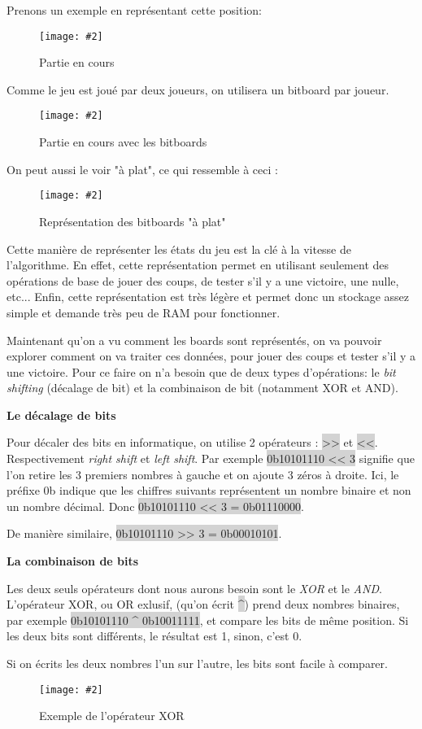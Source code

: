 \documentclass[a4paper]{article}
\newcommand{\img}[3][]{
    \begin{figure}[H]
        \centering
        \texttt{[image: \#2]}
        \caption{#1}    
    \end{figure}
}
\newcommand{\inlinecode}[1]{\colorbox{lightgray}{#1}}
\newcommand{\ptitle}[1]{\vspace{10pt}
{\large \textbf{#1}}}
\begin{document}
    Prenons un exemple en représentant cette position:
    \img[Partie en cours]{Images/ExempleBitBoardsPt1.png}{0.3}

    Comme le jeu est joué par deux joueurs, on utilisera un bitboard par joueur.
    \img[Partie en cours avec les bitboards]{Images/ExempleBitBoardsPt2.png}{0.7}
    On peut aussi le voir "à plat", ce qui ressemble à ceci :
    \img[Représentation des bitboards "à plat"]{Images/FlatBiboard.png}{1}

    Cette manière de représenter les états du jeu est la clé à la vitesse de l'algorithme. En effet, cette représentation permet en utilisant seulement des opérations de base de jouer des coups, de tester s'il y a une victoire, une nulle, etc... Enfin, cette représentation est très légère et permet donc un stockage assez simple et demande très peu de RAM pour fonctionner.

    Maintenant qu'on a vu comment les boards sont représentés, on va pouvoir explorer comment on va traiter ces données, pour jouer des coups et tester s'il y a une victoire. Pour ce faire on n'a besoin que de deux types d'opérations: le \textit{bit shifting} (décalage de bit) et la combinaison de bit (notamment XOR et AND).

    \ptitle{Le décalage de bits}

    Pour décaler des bits en informatique, on utilise 2 opérateurs : \inlinecode{>>} et \inlinecode{<<}. Respectivement \textit{right shift} et \textit{left shift}. Par exemple \inlinecode{0b10101110 << 3} signifie que l'on retire les 3 premiers nombres à gauche et on ajoute 3 zéros à droite. Ici, le préfixe 0b indique que les chiffres suivants représentent un nombre binaire et non un nombre décimal. Donc \inlinecode{0b10101110 << 3 = 0b01110000}.
   
    De manière similaire, \inlinecode{0b10101110 >> 3 = 0b00010101}.

    
    \ptitle{La combinaison de bits}

    Les deux seuls opérateurs dont nous aurons besoin sont le \textit{XOR} et le \textit{AND}. L'opérateur XOR, ou OR exlusif, (qu'on écrit \inlinecode{\^{}}) prend deux nombres binaires, par exemple \inlinecode{0b10101110 \^{} 0b10011111}, et compare les bits de même position. Si les deux bits sont différents, le résultat est 1, sinon, c'est 0.

    Si on écrits les deux nombres l'un sur l'autre, les bits sont facile à comparer.
    \img[Exemple de l'opérateur XOR]{Images/XORExemple.png}{0.15}
\end{document}
